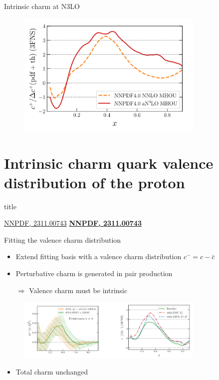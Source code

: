 \documentclass[aspectratio=43, 8pt,t]{beamer}
\newcommand{\SectionTitleFrame}[1][]{%
  \begin{frame}
    \vfill
    \centering
    \begin{beamercolorbox}[sep=8pt,center,shadow=true,rounded=true]{title}
      \usebeamerfont{title}\insertsection\par
    \end{beamercolorbox}
    \ifx\relax#1\relax\else
      \vspace{0.5cm}
      \textbf{#1}
    \fi
    \vfill
  \end{frame}
}
\begin{document}
\begin{frame}{Intrinsic charm at N3LO}
  \begin{figure}
    \includegraphics[width=0.8\textwidth]{n3lo_charm_pull.png}
  \end{figure}
\end{frame}

\section*{Intrinsic charm quark valence distribution of the proton}
\SectionTitleFrame[\hyperlink{https://arxiv.org/abs/2311.00743}{NNPDF, 2311.00743}]


\begin{frame}{Fitting the valence charm distribution}
  \begin{itemize}
    \item Extend fitting basis with a valence charm distribution $c^-=c-\bar{c}$
    \item Perturbative charm is generated in pair production
    \item[$\Rightarrow$] Valence charm must be intrinsic
  \end{itemize}
  \begin{figure}
    \includegraphics[width=0.8\textwidth]{valence_charm.png}
  \end{figure}
  \begin{itemize}
    \item Total charm unchanged
  \end{itemize}
\end{frame}
\end{document}
